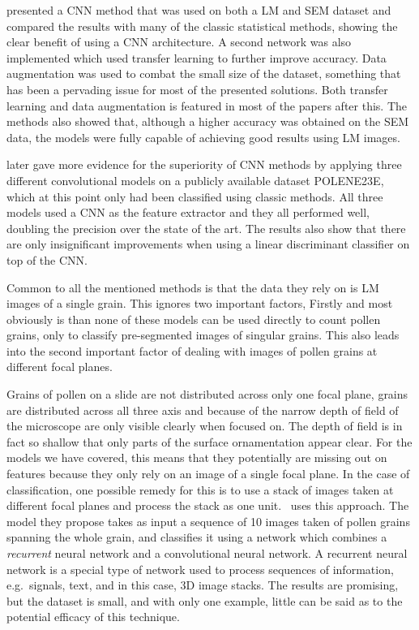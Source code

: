 {\cite{daood_pollen_2016}} presented a CNN method that was used on both a LM and SEM dataset and compared the results with many of the classic statistical methods, showing the clear benefit of using a CNN architecture.
A second network was also implemented which used transfer learning to further improve accuracy.
Data augmentation was used to combat the small size of the dataset, something that has been a pervading issue for most of the presented solutions.
Both transfer learning and data augmentation is featured in most of the papers after this.
The methods also showed that, although a higher accuracy was obtained on the SEM data, the models were fully capable of achieving good results using LM images.

{\cite{sevillano_improving_2018}} later gave more evidence for the superiority of CNN methods by applying three different convolutional models on a publicly available dataset {POLENE23E}, which at this point only had been classified using classic methods.
All three models used a CNN as the feature extractor and they all performed well, doubling the precision over the state of the art.
The results also show that there are only insignificant improvements when using a linear discriminant classifier on top of the CNN\@.

Common to all the mentioned methods is that the data they rely on is LM images of a single grain.
This ignores two important factors, Firstly and most obviously is than none of these models can be used directly to count pollen grains, only to classify pre-segmented images of singular grains.
This also leads into the second important factor of dealing with images of pollen grains at different focal planes.

Grains of pollen on a slide are not distributed across only one focal plane, grains are distributed across all three axis and because of the narrow depth of field of the microscope are only visible clearly when focused on.
The depth of field is in fact so shallow that only parts of the surface ornamentation appear clear.
For the models we have covered, this means that they potentially are missing out on features because they only rely on an image of a single focal plane.
In the case of classification, one possible remedy for this is to use a stack of images taken at different focal planes and process the stack as one unit.\ \textcite{DaoodAndRibeiro_2018} uses this approach.
The model they propose takes as input a sequence of 10 images taken of pollen grains spanning the whole grain, and classifies it using a network which combines a \textit{recurrent} neural network and a convolutional neural network.
A recurrent neural network is a special type of network used to process sequences of information, e.g.\ signals, text, and in this case, 3D image stacks.
The results are promising, but the dataset is small, and with only one example, little can be said as to the potential efficacy of this technique.

